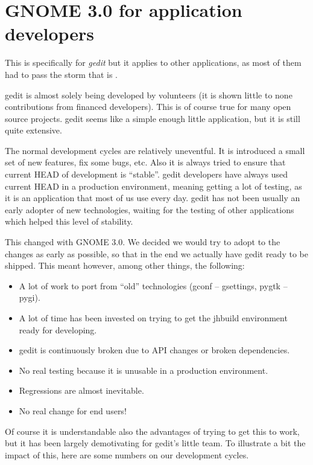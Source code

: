 
\chapter[GNOME 3.0 for application developers]{GNOME 3.0 for application developers\cite{website:gnome-3-0-for-application-developers}}

This is specifically for \emph{gedit} but it applies to other \GNOME applications, as most of them had to pass the storm that is .

gedit is almost solely being developed by volunteers (it is shown little to none contributions from financed developers). This is of course true for many open source projects. gedit seems like a simple enough little application, but it is still quite extensive.

The normal development cycles are relatively uneventful. It is introduced a small set of new features, fix some bugs, etc. Also it is always tried to ensure that current HEAD of development is ``stable''. gedit developers have always used current HEAD in a production environment, meaning getting a lot of testing, as it is an application that most of us use every day. gedit has not been usually an early adopter of new technologies, waiting for the testing of other applications which helped this level of stability.

This changed with GNOME 3.0. We decided we would try to adopt to the changes as early as possible, so that in the end we actually have gedit ready to be shipped. This meant however, among other things, the following:
\begin{itemize}
  \item A lot of work to port from ``old'' technologies (gconf – gsettings, pygtk – pygi).
  \item A lot of time has been invested on trying to get the jhbuild environment ready for developing.
  \item gedit is continuously broken due to API changes or broken dependencies.
  \item No real testing because it is unusable in a production environment.
  \item Regressions are almost inevitable.
  \item No real change for end users!
\end{itemize}

Of course it is understandable also the advantages of trying to get this to work, but it has been largely demotivating for gedit's little team. To illustrate a bit the impact of this, here are some numbers on our development cycles.

